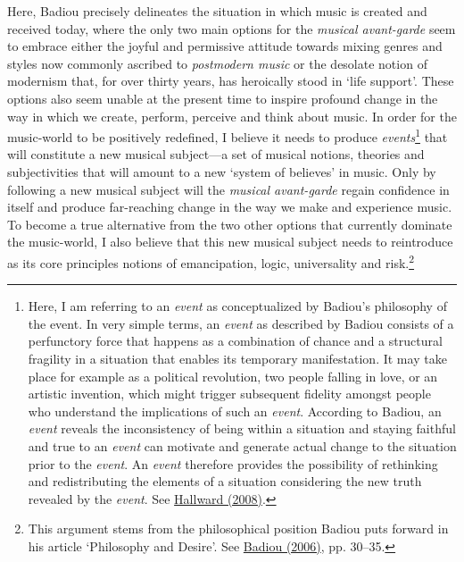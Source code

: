 Here, Badiou precisely delineates the situation in which music is created and received today, where the only two main options for the \emph{musical avant-garde} seem to embrace either the joyful and permissive attitude towards mixing genres and styles now commonly ascribed to \emph{postmodern music} or the desolate notion of modernism that, for over thirty years, has heroically stood in `life support'. These options also seem unable at the present time to inspire profound change in the way in which we create, perform, perceive and think about music. In order for the music-world to be positively redefined, I believe it needs to produce \emph{events}\footnote{Here, I am referring to an \emph{event} as conceptualized by  Badiou's philosophy of the event. In very simple terms, an \emph{event} as described by Badiou consists of a perfunctory force that happens as a combination of chance and a structural fragility in a situation that enables its temporary manifestation. It may take place for example as a political revolution, two people falling in love, or an artistic invention, which might trigger subsequent fidelity amongst people who understand the implications of such an \emph{event}. According to Badiou, an \emph{event} reveals the inconsistency of being within a situation and staying faithful and true to an \emph{event} can motivate and generate actual change to the situation prior to the \emph{event}. An \emph{event} therefore provides the possibility of rethinking and redistributing the elements of a situation considering the new truth revealed by the \emph{event}. See \hyperlink{hallward}{Hallward (2008)}.} that will constitute a new musical subject---a set of musical notions, theories and subjectivities that will amount to a new `system of believes' in music. Only by following a new musical subject will the \emph{musical avant-garde} regain confidence in itself and produce far-reaching change in the way we make and experience music. To become a true alternative from the two other options that currently dominate the music-world, I also believe that this new musical subject needs to reintroduce as its core principles notions of emancipation, logic, universality and risk.\footnote{This argument stems from the philosophical position Badiou puts forward in his article `Philosophy and Desire'. See \hyperlink{infthought}{Badiou (2006)}, pp. 30--35.}

